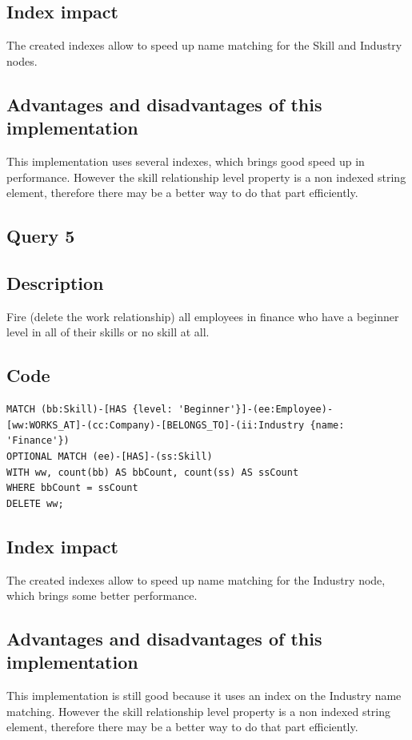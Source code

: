 \documentclass[a4paper, 11pt, titlepage]{article}
\begin{document}
\subsection* {Index impact}

\noindent
The created indexes allow to speed up name matching for the Skill and Industry nodes.


\subsection* {Advantages and disadvantages of this implementation}

\noindent
This implementation uses several indexes, which brings good speed up in performance. However the skill relationship level property is a non indexed string element, therefore there may be a better way to do that part efficiently.



\subsection {Query 5}

\subsection* {Description}

\noindent
Fire (delete the work relationship) all employees in finance who have a beginner level in all of their skills or no skill at all.


\subsection* {Code}

\begin{verbatim}
MATCH (bb:Skill)-[HAS {level: 'Beginner'}]-(ee:Employee)-
[ww:WORKS_AT]-(cc:Company)-[BELONGS_TO]-(ii:Industry {name: 'Finance'})
OPTIONAL MATCH (ee)-[HAS]-(ss:Skill)
WITH ww, count(bb) AS bbCount, count(ss) AS ssCount
WHERE bbCount = ssCount
DELETE ww;
\end{verbatim}


\subsection* {Index impact}

\noindent
The created indexes allow to speed up name matching for the Industry node, which brings some better performance.


\subsection* {Advantages and disadvantages of this implementation}

\noindent
This implementation is still good because it uses an index on the Industry name matching. However the skill relationship level property is a non indexed string element, therefore there may be a better way to do that part efficiently.
\end{document}
